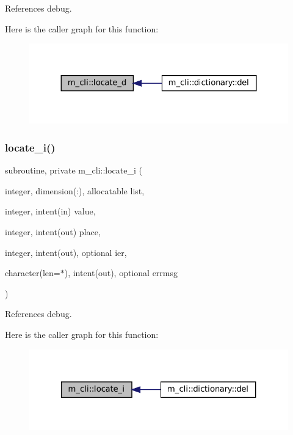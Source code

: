 References debug.

Here is the caller graph for this function\+:
\nopagebreak
\begin{figure}[H]
\begin{center}
\leavevmode
\includegraphics[width=324pt]{namespacem__cli_a4187c24a2abf5cc630232965637493e8_icgraph}
\end{center}
\end{figure}
\mbox{\label{namespacem__cli_a36665ab0ea5080c14c8c9e52ed07d397}} 
\subsubsection{\texorpdfstring{locate\+\_\+i()}{locate\_i()}}
{\footnotesize\ttfamily subroutine, private m\+\_\+cli\+::locate\+\_\+i (\begin{DoxyParamCaption}\item[{integer, dimension(\+:), allocatable}]{list,  }\item[{integer, intent(in)}]{value,  }\item[{integer, intent(out)}]{place,  }\item[{integer, intent(out), optional}]{ier,  }\item[{character(len=$\ast$), intent(out), optional}]{errmsg }\end{DoxyParamCaption})\hspace{0.3cm}{\ttfamily [private]}}



References debug.

Here is the caller graph for this function\+:
\nopagebreak
\begin{figure}[H]
\begin{center}
\leavevmode
\includegraphics[width=321pt]{namespacem__cli_a36665ab0ea5080c14c8c9e52ed07d397_icgraph}
\end{center}
\end{figure}
\mbox{\label{namespacem__cli_ac44389e115b536069f324bffea7d2469}} 
